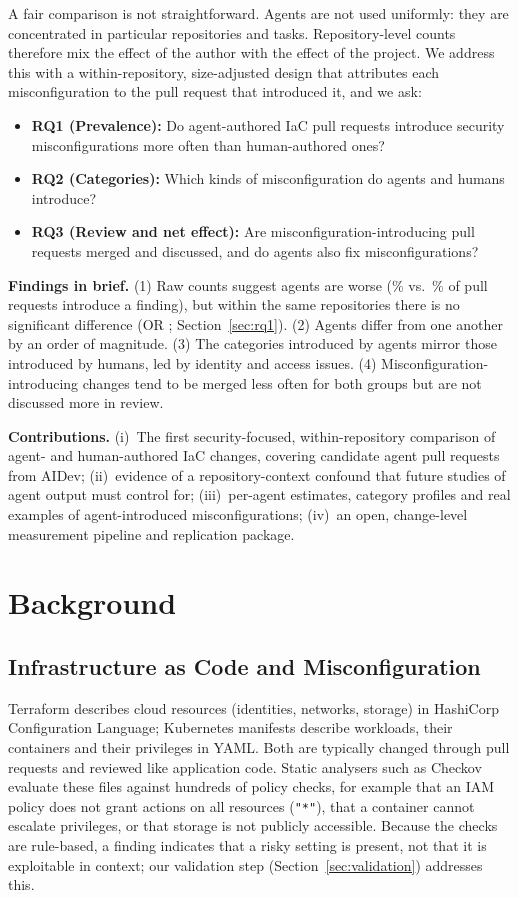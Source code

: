 \documentclass[10pt,conference]{IEEEtran}
\begin{document}
A fair comparison is not straightforward. Agents are not used uniformly: they are concentrated in particular repositories and tasks. Repository-level counts therefore mix the effect of the author with the effect of the project. We address this with a within-repository, size-adjusted design that attributes each misconfiguration to the pull request that introduced it, and we ask:
\begin{itemize}
  \item \textbf{RQ1 (Prevalence):} Do agent-authored IaC pull requests introduce security misconfigurations more often than human-authored ones?
  \item \textbf{RQ2 (Categories):} Which kinds of misconfiguration do agents and humans introduce?
  \item \textbf{RQ3 (Review and net effect):} Are misconfiguration-introducing pull requests merged and discussed, and do agents also fix misconfigurations?
\end{itemize}

\noindent\textbf{Findings in brief.} (1) Raw counts suggest agents are worse (\RawAgentPct\% vs.\ \RawHumanPct\% of pull requests introduce a finding), but within the same repositories there is no significant difference (OR \ORProd; Section~\ref{sec:rq1}). (2) Agents differ from one another by an order of magnitude. (3) The categories introduced by agents mirror those introduced by humans, led by identity and access issues. (4) Misconfiguration-introducing changes tend to be merged less often for both groups but are not discussed more in review.

\noindent\textbf{Contributions.} (i)~The first security-focused, within-repository comparison of agent- and human-authored IaC changes, covering \NaidevIac{} candidate agent pull requests from AIDev; (ii)~evidence of a repository-context confound that future studies of agent output must control for; (iii)~per-agent estimates, category profiles and real examples of agent-introduced misconfigurations; (iv)~an open, change-level measurement pipeline and replication package.

\section{Background}
\subsection{Infrastructure as Code and Misconfiguration}
Terraform describes cloud resources (identities, networks, storage) in HashiCorp Configuration Language; Kubernetes manifests describe workloads, their containers and their privileges in YAML. Both are typically changed through pull requests and reviewed like application code. Static analysers such as Checkov evaluate these files against hundreds of policy checks, for example that an IAM policy does not grant actions on all resources (\texttt{"*"}), that a container cannot escalate privileges, or that storage is not publicly accessible. Because the checks are rule-based, a finding indicates that a risky setting is present, not that it is exploitable in context; our validation step (Section~\ref{sec:validation}) addresses this.
\end{document}

